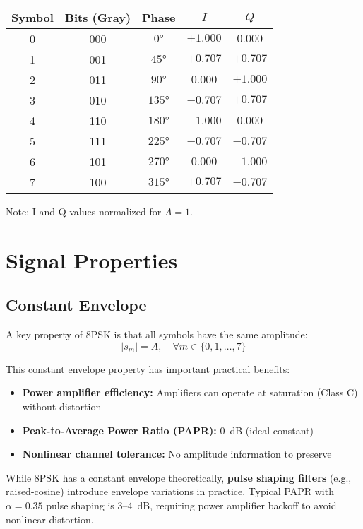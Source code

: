 \begin{center}
\begin{tabular}{@{}ccccc@{}}
\toprule
Symbol & Bits (Gray) & Phase & $I$ & $Q$ \\
\midrule
0 & 000 & $0°$ & $+1.000$ & $0.000$ \\
1 & 001 & $45°$ & $+0.707$ & $+0.707$ \\
2 & 011 & $90°$ & $0.000$ & $+1.000$ \\
3 & 010 & $135°$ & $-0.707$ & $+0.707$ \\
4 & 110 & $180°$ & $-1.000$ & $0.000$ \\
5 & 111 & $225°$ & $-0.707$ & $-0.707$ \\
6 & 101 & $270°$ & $0.000$ & $-1.000$ \\
7 & 100 & $315°$ & $+0.707$ & $-0.707$ \\
\bottomrule
\end{tabular}
\end{center}

Note: I and Q values normalized for $A = 1$.

\section{Signal Properties}

\subsection{Constant Envelope}

A key property of 8PSK is that all symbols have the same amplitude:
\begin{equation}
|s_m| = A, \quad \forall m \in \{0, 1, \ldots, 7\}
\end{equation}

This constant envelope property has important practical benefits:
\begin{itemize}
\item \textbf{Power amplifier efficiency:} Amplifiers can operate at saturation (Class C) without distortion
\item \textbf{Peak-to-Average Power Ratio (PAPR):} 0~dB (ideal constant)
\item \textbf{Nonlinear channel tolerance:} No amplitude information to preserve
\end{itemize}

\begin{warningbox}
While 8PSK has a constant envelope theoretically, \textbf{pulse shaping filters} (e.g., raised-cosine) introduce envelope variations in practice. Typical PAPR with $\alpha = 0.35$ pulse shaping is 3--4~dB, requiring power amplifier backoff to avoid nonlinear distortion.
\end{warningbox}

